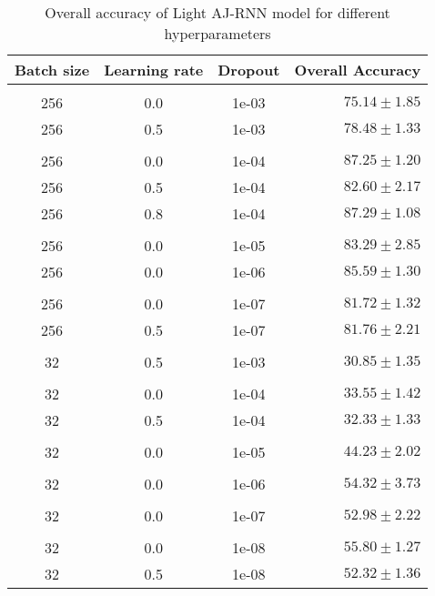 \begin{table}[H]
  \centering
  \begin{tabular}{cccr} 
      Batch size & Learning rate & Dropout & Overall Accuracy\\[0.2cm] 
      \hline \\[-0.2cm]
      256 & 0.0 & 1e-03 & $75.14 \pm 1.85$\\
      256 & 0.5 & 1e-03 & $78.48 \pm 1.33$\\[0.05cm] \hline \\[-0.25cm]

      256 & 0.0 & 1e-04 & $87.25 \pm 1.20$\\
      256 & 0.5 & 1e-04 & $82.60 \pm 2.17$\\
      256 & 0.8 & 1e-04 & $\mathbf{87.29 \pm 1.08}$\\[0.05cm] \hline \\[-0.25cm]

      256 & 0.0 & 1e-05 & $83.29 \pm 2.85$\\
      256 & 0.0 & 1e-06 & $85.59 \pm 1.30$\\[0.05cm] \hline \\[-0.25cm]

      256 & 0.0 & 1e-07 & $81.72 \pm 1.32$\\
      256 & 0.5 & 1e-07 & $81.76 \pm 2.21$\\[0.05cm] \hline \\[-0.25cm]

      32  & 0.5 & 1e-03 & $30.85 \pm 1.35$\\[0.05cm] \hline \\[-0.25cm]

      32  & 0.0 & 1e-04 & $33.55 \pm 1.42$\\
      32  & 0.5 & 1e-04 & $32.33 \pm 1.33$\\[0.05cm] \hline \\[-0.25cm]

      32  & 0.0 & 1e-05 & $44.23 \pm 2.02$\\[0.05cm] \hline \\[-0.25cm]
      32  & 0.0 & 1e-06 & $54.32 \pm 3.73$\\[0.05cm] \hline \\[-0.25cm]
      32  & 0.0 & 1e-07 & $52.98 \pm 2.22$\\[0.05cm] \hline \\[-0.25cm]
      32  & 0.0 & 1e-08 & $\mathbf{55.80 \pm 1.27}$\\
      32  & 0.5 & 1e-08 & $52.32 \pm 1.36$\\
  \end{tabular}
  \caption{Overall accuracy of Light AJ-RNN model for different hyperparameters}
  \label{tab:LightAJRNNBatchSizeResults}
\end{table}

